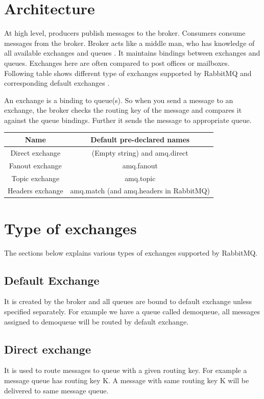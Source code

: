 \documentclass[9pt,twocolumn,twoside]{styles/osajnl}
\begin{document}
\section{Architecture}
At high level, producers publish messages to the broker. Consumers consume
messages from the broker. Broker acts like a middle man, who has knowledge of
all available exchanges and queues \cite{videla2012rabbitmq}. It maintains
bindings between exchanges and queues. Exchanges here are often compared to post
offices or mailboxes.  Following table shows different type of exchanges
supported by RabbitMQ and corresponding default exchanges
\cite{www-rabbitmq-pivotal} .

An exchange is a binding to queue(s). So when you send a
message to an exchange, the broker checks the routing key of the message
and compares it against the queue bindings. Further it sends the message to
appropriate queue.

\begin{center}
 \begin{tabular}{||c c||} 
 \hline
 Name & Default pre-declared names \\ [0.5ex] 
 \hline\hline
 Direct exchange & (Empty string) and amq.direct  \\ 
 \hline
 Fanout exchange & amq.fanout  \\
 \hline
 Topic exchange & amq.topic  \\
 \hline
 Headers exchange & amq.match (and amq.headers in RabbitMQ) \\
 \hline
\end{tabular}
\end{center}

\section{Type of exchanges}
\label{sec:examples}

The sections below explains various types of exchanges supported by RabbitMQ.

\subsection{Default Exchange}
It is created by the broker and all queues are bound to default exchange unless 
specified separately. For example we have a queue called demoqueue, all messages 
assigned to demoqueue will be routed by default exchange.

\subsection{Direct exchange}
It is used to route messages to queue with a given routing key. For example a 
message queue has routing key K. A message with same routing key K will be 
delivered to same message queue.
\end{document}
